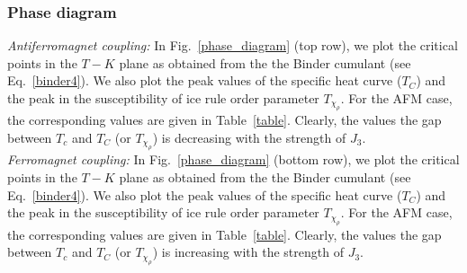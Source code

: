 \subsubsection{Phase diagram}
\indent \indent \textit{Antiferromagnet coupling:} In Fig.~\ref{phase_diagram} (top row), we plot the critical points in the $T-K$ plane as obtained from the the Binder cumulant (see Eq.~\eqref{binder4}). We also plot the peak values of the specific heat curve ($T_{C}$) and the peak in the susceptibility of ice rule order parameter $T_{\chi_\rho}$. For the AFM case, the corresponding values are given in Table~\ref{table}. Clearly, the values the gap between $T_c$ and $T_C$ (or $T_{\chi_\rho}$) is decreasing with the strength of $J_3$.\\
\indent \textit{Ferromagnet coupling:} In Fig.~\ref{phase_diagram} (bottom row), we plot the critical points in the $T-K$ plane as obtained from the the Binder cumulant (see Eq.~\eqref{binder4}). We also plot the peak values of the specific heat curve ($T_{C}$) and the peak in the susceptibility of ice rule order parameter $T_{\chi_\rho}$. For the AFM case, the corresponding values are given in Table~\ref{table}. Clearly, the values the gap between $T_c$ and $T_C$ (or $T_{\chi_\rho}$) is increasing with the strength of $J_3$.
